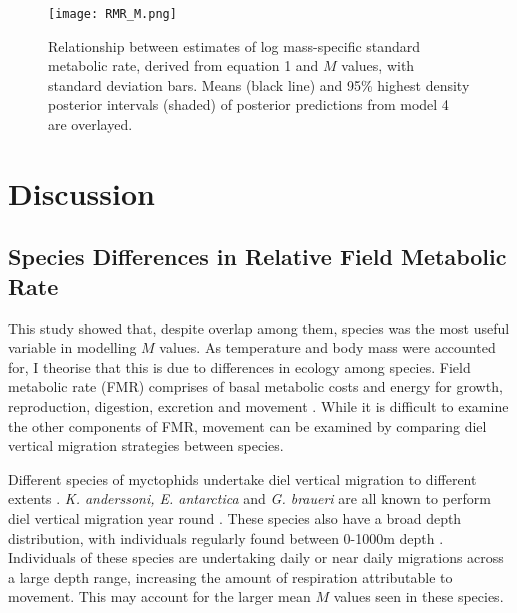 \documentclass[12pt, titlepage]{article}
\begin{document}
\begin{figure}[H]
\texttt{[image: RMR\_M.png]}
\caption{Relationship between estimates of log mass-specific standard metabolic rate, derived from equation 1  and $M$ values, with standard deviation bars. Means (black line) and 95\% highest density posterior intervals (shaded) of posterior predictions from model 4 are overlayed.} 
\label{fig:Resp}
\end{figure}

\pagebreak
\section{Discussion}

\subsection{Species Differences in Relative Field Metabolic Rate}

This study showed that, despite overlap among them, species was the most useful variable in modelling $M$ values.
As temperature and body mass were accounted for, I theorise that this is due to differences in ecology among species.
Field metabolic rate (FMR) comprises of basal metabolic costs and energy for growth, reproduction, digestion, excretion and movement \citep{Treberg2016}.
While it is difficult to examine the other components of FMR, movement can be examined by comparing diel vertical migration strategies between species.

Different species of myctophids undertake diel vertical migration to different extents \citep{Watanabe1999, Catul2011}.
\textit{K. anderssoni, E. antarctica} and \textit{G. braueri} are all known to perform diel vertical migration year round  \citep{Torres1988b, Piatkowski1994, Collins2008, Saunders2015a, Lourenco2017}. 
These species also have a broad depth distribution, with individuals regularly found between 0-1000m depth \citep{GonHeemstra, Pusch2004, Saunders2014}.  
Individuals of these species are undertaking daily or near daily migrations across a large depth range, increasing the amount of respiration attributable to movement.
This may account for the larger mean $M$ values seen in these species.
\end{document}

